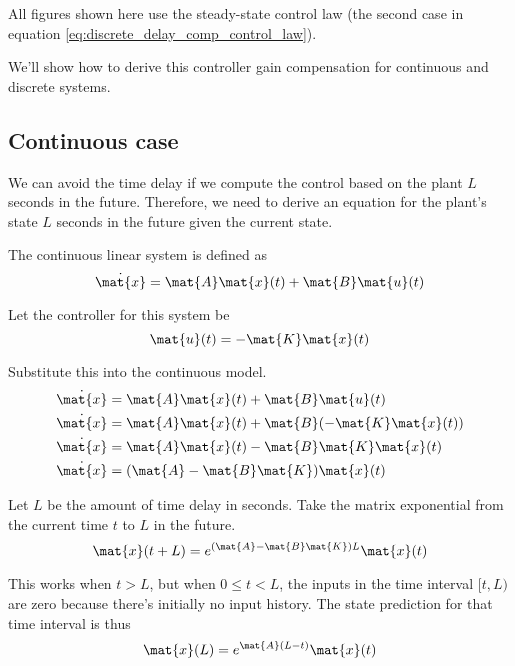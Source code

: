 All figures shown here use the steady-state control law (the second case in
equation \eqref{eq:discrete_delay_comp_control_law}).

We'll show how to derive this controller gain compensation for continuous and
discrete systems.

\subsection{Continuous case}

We can avoid the time delay if we compute the control based on the plant $L$
seconds in the future. Therefore, we need to derive an equation for the plant's
state $L$ seconds in the future given the current state.

The continuous linear system is defined as
\begin{equation*}
  \dot{\mat{x}} = \mat{A}\mat{x}(t) + \mat{B}\mat{u}(t)
\end{equation*}

Let the controller for this system be
\begin{equation*}
  \mat{u}(t) = -\mat{K}\mat{x}(t)
\end{equation*}

Substitute this into the continuous model.
\begin{align*}
  \dot{\mat{x}} &= \mat{A}\mat{x}(t) + \mat{B}\mat{u}(t) \\
  \dot{\mat{x}} &= \mat{A}\mat{x}(t) + \mat{B}(-\mat{K}\mat{x}(t)) \\
  \dot{\mat{x}} &= \mat{A}\mat{x}(t) - \mat{B}\mat{K}\mat{x}(t) \\
  \dot{\mat{x}} &= (\mat{A} - \mat{B}\mat{K}) \mat{x}(t)
\end{align*}

Let $L$ be the amount of time delay in seconds. Take the matrix exponential from
the current time $t$ to $L$ in the future.
\begin{equation}
  \mat{x}(t + L) = e^{(\mat{A} - \mat{B}\mat{K})L} \mat{x}(t)
    \label{eq:continuous_advance_state_by_delay_post}
\end{equation}

This works when $t > L$, but when $0 \leq t < L$, the inputs in the time
interval $[t, L)$ are zero because there's initially no input history. The state
prediction for that time interval is thus
\begin{equation*}
  \mat{x}(L) = e^{\mat{A}(L - t)} \mat{x}(t)
\end{equation*}


